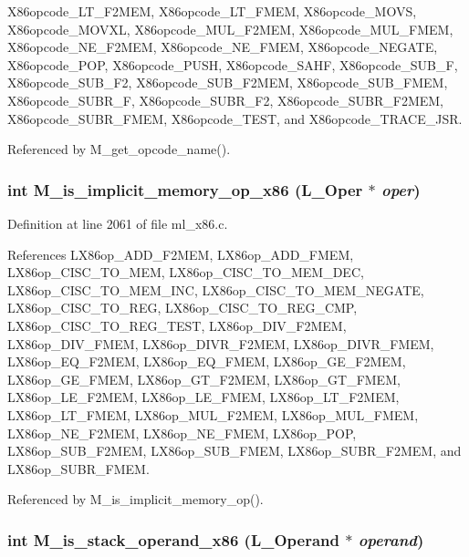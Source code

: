 X86opcode\_\-LT\_\-F2MEM, X86opcode\_\-LT\_\-FMEM, X86opcode\_\-MOVS, X86opcode\_\-MOVXL, X86opcode\_\-MUL\_\-F2MEM, X86opcode\_\-MUL\_\-FMEM, X86opcode\_\-NE\_\-F2MEM, X86opcode\_\-NE\_\-FMEM, X86opcode\_\-NEGATE, X86opcode\_\-POP, X86opcode\_\-PUSH, X86opcode\_\-SAHF, X86opcode\_\-SUB\_\-F, X86opcode\_\-SUB\_\-F2, X86opcode\_\-SUB\_\-F2MEM, X86opcode\_\-SUB\_\-FMEM, X86opcode\_\-SUBR\_\-F, X86opcode\_\-SUBR\_\-F2, X86opcode\_\-SUBR\_\-F2MEM, X86opcode\_\-SUBR\_\-FMEM, X86opcode\_\-TEST, and X86opcode\_\-TRACE\_\-JSR.

Referenced by M\_\-get\_\-opcode\_\-name().
\subsubsection{\setlength{\rightskip}{0pt plus 5cm}int M\_\-is\_\-implicit\_\-memory\_\-op\_\-x86 (L\_\-Oper $\ast$ {\em oper})}\label{ml__x86_8c_8094bced93f8bcf74e45e53f1d914b0e}




Definition at line 2061 of file ml\_\-x86.c.

References LX86op\_\-ADD\_\-F2MEM, LX86op\_\-ADD\_\-FMEM, LX86op\_\-CISC\_\-TO\_\-MEM, LX86op\_\-CISC\_\-TO\_\-MEM\_\-DEC, LX86op\_\-CISC\_\-TO\_\-MEM\_\-INC, LX86op\_\-CISC\_\-TO\_\-MEM\_\-NEGATE, LX86op\_\-CISC\_\-TO\_\-REG, LX86op\_\-CISC\_\-TO\_\-REG\_\-CMP, LX86op\_\-CISC\_\-TO\_\-REG\_\-TEST, LX86op\_\-DIV\_\-F2MEM, LX86op\_\-DIV\_\-FMEM, LX86op\_\-DIVR\_\-F2MEM, LX86op\_\-DIVR\_\-FMEM, LX86op\_\-EQ\_\-F2MEM, LX86op\_\-EQ\_\-FMEM, LX86op\_\-GE\_\-F2MEM, LX86op\_\-GE\_\-FMEM, LX86op\_\-GT\_\-F2MEM, LX86op\_\-GT\_\-FMEM, LX86op\_\-LE\_\-F2MEM, LX86op\_\-LE\_\-FMEM, LX86op\_\-LT\_\-F2MEM, LX86op\_\-LT\_\-FMEM, LX86op\_\-MUL\_\-F2MEM, LX86op\_\-MUL\_\-FMEM, LX86op\_\-NE\_\-F2MEM, LX86op\_\-NE\_\-FMEM, LX86op\_\-POP, LX86op\_\-SUB\_\-F2MEM, LX86op\_\-SUB\_\-FMEM, LX86op\_\-SUBR\_\-F2MEM, and LX86op\_\-SUBR\_\-FMEM.

Referenced by M\_\-is\_\-implicit\_\-memory\_\-op().
\subsubsection{\setlength{\rightskip}{0pt plus 5cm}int M\_\-is\_\-stack\_\-operand\_\-x86 (L\_\-Operand $\ast$ {\em operand})}\label{ml__x86_8c_e6af9ef9a98871917df4258d42946f5e}




